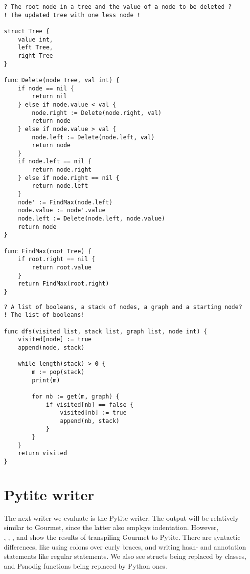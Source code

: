 \begin{lstlisting}[caption={The result of transpiling \Cref{deleteBSTGourmet} back to Gourmet.}, captionpos=b, label={deleteBSTGourmet2}]
? The root node in a tree and the value of a node to be deleted ?
! The updated tree with one less node !

struct Tree {
	value int,
	left Tree,
	right Tree
}

func Delete(node Tree, val int) {
	if node == nil {
		return nil
	} else if node.value < val {
		node.right := Delete(node.right, val)
		return node
	} else if node.value > val {
		node.left := Delete(node.left, val)
		return node
	}
	if node.left == nil {
		return node.right
	} else if node.right == nil {
		return node.left
	}
	node' := FindMax(node.left)
	node.value := node'.value
	node.left := Delete(node.left, node.value)
	return node
}

func FindMax(root Tree) {
	if root.right == nil {
		return root.value
	}
	return FindMax(root.right)
}
\end{lstlisting}

\begin{lstlisting}[caption={The result of transpiling \Cref{dfsGourmet} back to Gourmet.}, captionpos=b, label={dfsGourmet2}]
? A list of booleans, a stack of nodes, a graph and a starting node?
! The list of booleans!

func dfs(visited list, stack list, graph list, node int) {
    visited[node] := true
    append(node, stack)

    while length(stack) > 0 {
        m := pop(stack)
        print(m)

        for nb := get(m, graph) {
            if visited[nb] == false {
                visited[nb] := true
                append(nb, stack)
            }
        }
    }
    return visited
}
\end{lstlisting}

\section{Pytite writer}

The next writer we evaluate is the Pytite writer. The output will be relatively similar to Gourmet, since the latter also employs indentation. However,  \\

, , , and  show the results of transpiling Gourmet to Pytite. There are syntactic differences, like using colons over curly braces, and writing hash- and annotation statements like regular statements. We also see structs being replaced by classes, and Psnodig functions being replaced by Python ones. \\

